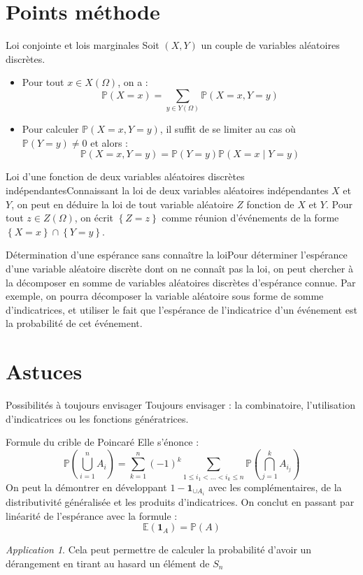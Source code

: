 \documentclass[french]{book}
\renewcommand{\P}{\mathbb{P}}
\newcommand{\E}{\mathbb{E}}
\theoremstyle{plain}
\theoremstyle{definition}
\theoremstyle{remark}
\newtheorem*{app}{Application}
\begin{document}
\section{Points méthode}
\begin{PM}{Loi conjointe et lois marginales} Soit $(X,Y)$ un couple de variables aléatoires discrètes.
\begin{itemize}
	\item Pour tout $x\in X(\Omega)$, on a : $$\P(X=x)=\sum_{y\in Y(\Omega)}\P(X=x,Y=y)$$
	\item Pour calculer $\P(X=x,Y=y)$, il suffit de se limiter au cas où $\P(Y=y)\ne 0$ et alors : $$\P(X=x,Y=y)=\P(Y=y)\P(X=x\mid Y=y)$$
\end{itemize}
\end{PM} 
\begin{PM}{Loi d'une fonction de deux variables aléatoires discrètes indépendantes}Connaissant la loi de deux variables aléatoires indépendantes $X$ et $Y$, on peut en déduire la loi de tout variable aléatoire $Z$ fonction de $X$ et $Y$. Pour tout $z\in Z(\Omega)$, on écrit $\left\{Z=z\right\}$ comme réunion d'événements de la forme $\left\{X=x\right\}\cap\left\{Y=y\right\}$.
\end{PM}
\begin{PM}{Détermination d'une espérance sans connaître la loi}Pour déterminer l'espérance d'une variable aléatoire discrète dont on ne connaît pas la loi, on peut chercher à la décomposer en somme de variables aléatoires discrètes d'espérance connue. Par exemple, on pourra décomposer la variable aléatoire sous forme de somme d'indicatrices, et utiliser le fait que l'espérance de l'indicatrice d'un événement est la probabilité de cet événement.
\end{PM}
\section{Astuces}

\begin{AS}{Possibilités à toujours envisager} Toujours envisager : la combinatoire, l'utilisation d'indicatrices ou les fonctions génératrices.
\end{AS}

\begin{AS}{Formule du crible de Poincaré} Elle s'énonce : $$\P\left(\bigcup_{i=1}^{n}A_i\right)=\sum_{k=1}^{n}(-1)^k\sum_{1\leqslant i_1<\ldots<i_k\leqslant n}\P\left(\bigcap_{j=1}^{k}A_{i_j}\right)$$ On peut la démontrer en développant $1-\mathbf{1}_{\cup A_i}$ avec les complémentaires, de la distributivité généralisée et les produits d'indicatrices. On conclut en passant par linéarité de l'espérance avec la formule : $$\E(\mathbf{1}_A)=\P(A)$$
\end{AS}
\begin{app} Cela peut permettre de calculer la probabilité d'avoir un dérangement en tirant au hasard un élément de $S_n$
\end{app}
\end{document}
